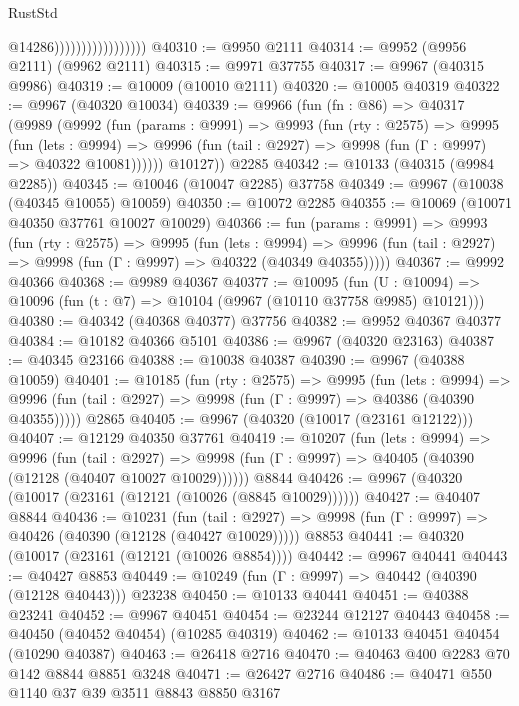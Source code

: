 \begin{lexlean}{RustStd}
\begin{coremodule}
                                      @14286)))))))))))))))))
@40310 := @9950 @2111
@40314 := @9952 (@9956 @2111) (@9962 @2111)
@40315 := @9971 @37755
@40317 := @9967 (@40315 @9986)
@40319 := @10009 (@10010 @2111)
@40320 := @10005 @40319
@40322 := @9967 (@40320 @10034)
@40339 := @9966
    (fun (fn : @86) =>
    @40317
      (@9989
        (@9992
          (fun (params : @9991) =>
          @9993
            (fun (rty : @2575) =>
            @9995
              (fun (lets : @9994) =>
              @9996 (fun (tail : @2927) => @9998 (fun (Γ : @9997) => @40322 @10081))))))
        @10127))
    @2285
@40342 := @10133 (@40315 (@9984 @2285))
@40345 := @10046 (@10047 @2285) @37758
@40349 := @9967 (@10038 (@40345 @10055) @10059)
@40350 := @10072 @2285
@40355 := @10069 (@10071 @40350 @37761 @10027 @10029)
@40366 := fun (params : @9991) =>
  @9993
    (fun (rty : @2575) =>
    @9995
      (fun (lets : @9994) =>
      @9996 (fun (tail : @2927) => @9998 (fun (Γ : @9997) => @40322 (@40349 @40355)))))
@40367 := @9992 @40366
@40368 := @9989 @40367
@40377 := @10095
    (fun (U : @10094) => @10096 (fun (t : @7) => @10104 (@9967 (@10110 @37758 @9985) @10121)))
@40380 := @40342 (@40368 @40377) @37756
@40382 := @9952 @40367 @40377
@40384 := @10182 @40366 @5101
@40386 := @9967 (@40320 @23163)
@40387 := @40345 @23166
@40388 := @10038 @40387
@40390 := @9967 (@40388 @10059)
@40401 := @10185
    (fun (rty : @2575) =>
    @9995
      (fun (lets : @9994) =>
      @9996 (fun (tail : @2927) => @9998 (fun (Γ : @9997) => @40386 (@40390 @40355)))))
    @2865
@40405 := @9967 (@40320 (@10017 (@23161 @12122)))
@40407 := @12129 @40350 @37761
@40419 := @10207
    (fun (lets : @9994) =>
    @9996
      (fun (tail : @2927) =>
      @9998 (fun (Γ : @9997) => @40405 (@40390 (@12128 (@40407 @10027 @10029))))))
    @8844
@40426 := @9967 (@40320 (@10017 (@23161 (@12121 (@10026 (@8845 @10029))))))
@40427 := @40407 @8844
@40436 := @10231
    (fun (tail : @2927) => @9998 (fun (Γ : @9997) => @40426 (@40390 (@12128 (@40427 @10029)))))
    @8853
@40441 := @40320 (@10017 (@23161 (@12121 (@10026 @8854))))
@40442 := @9967 @40441
@40443 := @40427 @8853
@40449 := @10249 (fun (Γ : @9997) => @40442 (@40390 (@12128 @40443))) @23238
@40450 := @10133 @40441
@40451 := @40388 @23241
@40452 := @9967 @40451
@40454 := @23244 @12127 @40443
@40458 := @40450 (@40452 @40454) (@10285 @40319)
@40462 := @10133 @40451 @40454 (@10290 @40387)
@40463 := @26418 @2716
@40470 := @40463 @400 @2283 @70 @142 @8844 @8851 @3248
@40471 := @26427 @2716
@40486 := @40471
    @550
    @1140
    @37
    @39
    @3511
    @8843
    @8850
    @3167

\end{coremodule}
\end{lexlean}
